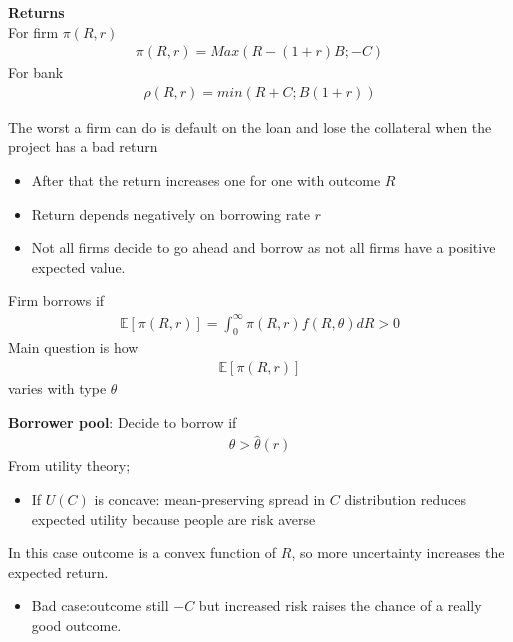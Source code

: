 \documentclass{beamer}
\begin{document}
\begin{frame}
 \textbf{Returns}\\
 \medskip
 For firm $\pi(R,r)$ 
\begin{align}
  \pi(R,r)=Max(R-(1+r)B;-C)
\end{align}
\medskip
For bank
\begin{align}
  \rho(R,r)=min(R+C;B(1+r))
\end{align}
\end{frame}

\begin{frame}
The worst a firm can do is default on the loan and lose the collateral when the project has a bad return
\begin{itemize}
  \item After that the return increases one for one with outcome $R$
  \item Return depends negatively on borrowing rate $r$
  \item Not all firms decide to go ahead and borrow as not all firms have a positive expected value.
\end{itemize}
\end{frame}

\begin{frame}
Firm borrows if
\begin{align}
  \mathbb{E}[\pi(R,r)]=\int_0^{\infty} \pi(R,r)f(R,\theta)dR>0
\end{align}
\medskip
Main question is how 
\begin{align}
  \mathbb{E}[\pi(R,r)]
\end{align}
\medskip
varies with type $\theta$
\end{frame}

\begin{frame}
\textbf{Borrower pool}: Decide to borrow if
\begin{align}
  \theta > \hat{\theta}(r)
\end{align}
\medskip
From utility theory;
\begin{itemize}
  \item If $U(C)$ is concave: mean-preserving spread in $C$ distribution reduces expected utility because people are risk averse
\end{itemize}
\medskip
In this case outcome is a convex function of $R$, so more uncertainty increases the expected return. 
\begin{itemize}
  \item Bad case:outcome still $−C$ but increased risk raises the chance of a really good outcome.
\end{itemize}
\end{frame}
\end{document}
